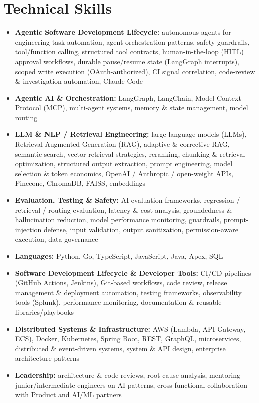 \documentclass[10.5pt,letterpaper]{article}
\newcommand{\resumeItem}[1]{\item\small{#1}}
\begin{document}
\section*{Technical Skills}
\begin{itemize}
    \resumeItem{\textbf{Agentic Software Development Lifecycle:} autonomous agents for engineering task automation, agent orchestration patterns, safety guardrails, tool/function calling, structured tool contracts, human-in-the-loop (HITL) approval workflows, durable pause/resume state (LangGraph interrupts), scoped write execution (OAuth-authorized), CI signal correlation, code-review \& investigation automation, Claude Code}
    \resumeItem{\textbf{Agentic AI \& Orchestration:} LangGraph, LangChain, Model Context Protocol (MCP), multi-agent systems, memory \& state management, model routing}
    \resumeItem{\textbf{LLM \& NLP / Retrieval Engineering:} large language models (LLMs), Retrieval Augmented Generation (RAG), adaptive \& corrective RAG, semantic search, vector retrieval strategies, reranking, chunking \& retrieval optimization, structured output extraction, prompt engineering, model selection \& token economics, OpenAI / Anthropic / open-weight APIs, Pinecone, ChromaDB, FAISS, embeddings}
    \resumeItem{\textbf{Evaluation, Testing \& Safety:} AI evaluation frameworks, regression / retrieval / routing evaluation, latency \& cost analysis, groundedness \& hallucination reduction, model performance monitoring, guardrails, prompt-injection defense, input validation, output sanitization, permission-aware execution, data governance}
    \resumeItem{\textbf{Languages:} Python, Go, TypeScript, JavaScript, Java, Apex, SQL}
    \resumeItem{\textbf{Software Development Lifecycle \& Developer Tools:} CI/CD pipelines (GitHub Actions, Jenkins), Git-based workflows, code review, release management \& deployment automation, testing frameworks, observability tools (Splunk), performance monitoring, documentation \& reusable libraries/playbooks}
    \resumeItem{\textbf{Distributed Systems \& Infrastructure:} AWS (Lambda, API Gateway, ECS), Docker, Kubernetes, Spring Boot, REST, GraphQL, microservices, distributed \& event-driven systems, system \& API design, enterprise architecture patterns}
    \resumeItem{\textbf{Leadership:} architecture \& code reviews, root-cause analysis, mentoring junior/intermediate engineers on AI patterns, cross-functional collaboration with Product and AI/ML partners}
\end{itemize}

\end{document}
